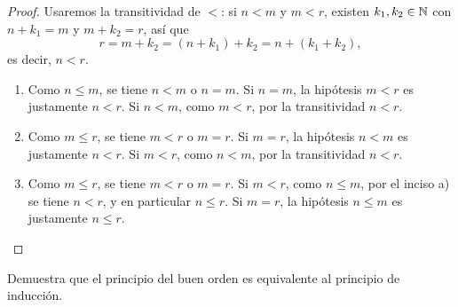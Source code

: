 \documentclass[12pt,a4paper]{article}
\begin{document}
    \begin{proof}
        Usaremos la transitividad de $<$: si $n<m$ y $m<r$, existen $k_1,k_2\in\mathbb{N}$ con $n+k_1=m$ y $m+k_2=r$, así que
        \begin{equation*}
            r=m+k_2=(n+k_1)+k_2=n+(k_1+k_2),
        \end{equation*}
        es decir, $n<r$.
        \begin{enumerate}
            \item[a)] Como $n\le m$, se tiene $n<m$ o $n=m$. Si $n=m$, la hipótesis $m<r$ es justamente $n<r$. Si $n<m$,
            como $m<r$, por la transitividad $n<r$.
            \item[b)] Como $m\le r$, se tiene $m<r$ o $m=r$. Si $m=r$, la hipótesis $n<m$ es justamente $n<r$. Si $m<r$,
            como $n<m$, por la transitividad $n<r$.
            \item[c)] Como $m\le r$, se tiene $m<r$ o $m=r$. Si $m<r$, como $n\le m$, por el inciso a) se tiene $n<r$,
            y en particular $n\le r$. Si $m=r$, la hipótesis $n\le m$ es justamente $n\le r$. \qedhere
        \end{enumerate}
    \end{proof}

    \begin{problema}
        Demuestra que el principio del buen orden es equivalente al principio de inducción.
    \end{problema}
\end{document}
